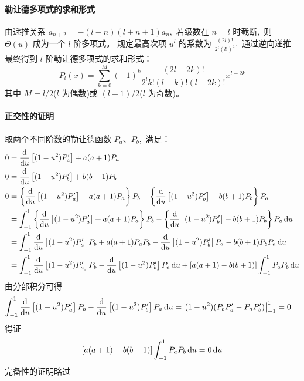 \paragraph{勒让德多项式的求和形式}
由递推关系 $a_{n+2} = -(l-n)(l+n+1)a_n$, \,若级数在 $n=l$ 时截断, \,则 $\Theta(u)$ 成为一个 $l$ 阶多项式。
规定最高次项 $u^l$ 的系数为 $\frac{(2l)!}{2^l(l!)^2}$, \,通过逆向递推
最终得到 $l$ 阶勒让德多项式的求和形式：
\begin{equation}
    P_l(x) = \sum_{k=0}^{M} (-1)^k \frac{(2l-2k)!}{2^l k! (l-k)! (l-2k)!} x^{l-2k}
\end{equation}
其中 $M = l/2$($l$ 为偶数)或 $(l-1)/2$($l$ 为奇数)。

\paragraph{正交性的证明}
取两个不同阶数的勒让德函数 $P_a$、$P_b$, \,满足：
\begin{align*}
    0&=
\frac{\dif}{\dif u}\left[(1-u^2)P_a'\right]
+a(a+1)P_a\\
    0&=
\frac{\dif}{\dif u}\left[(1-u^2)P_b'\right]
+b(b+1)P_b\\
    0&=
\left\{\frac{\dif}{\dif u}\left[(1-u^2)P_a'\right]
+a(a+1)P_a\right\}P_b
-\left\{\frac{\dif}{\dif u}\left[(1-u^2)P_b'\right]
+b(b+1)P_b\right\}P_a
\\
&=\int_{-1}^{1}
\left\{\frac{\dif}{\dif u}\left[(1-u^2)P_a'\right]
+a(a+1)P_a\right\}P_b
-\left\{\frac{\dif}{\dif u}\left[(1-u^2)P_b'\right]
+b(b+1)P_b\right\}P_a\dif u
\\
&=\int_{-1}^{1}
\frac{\dif}{\dif u}\left[(1-u^2)P_a'\right]P_b
+a(a+1)P_aP_b
-\frac{\dif}{\dif u}\left[(1-u^2)P_b'\right]P_a
-b(b+1)P_bP_a\dif u
\\
&=\int_{-1}^{1}
\frac{\dif}{\dif u}\left[(1-u^2)P_a'\right]P_b
-\frac{\dif}{\dif u}\left[(1-u^2)P_b'\right]P_a\dif u
+\left[a(a+1)-b(b+1)\right]\int_{-1}^{1}P_aP_b
\dif u
\end{align*}
由分部积分可得
\begin{align*}
    \int_{-1}^{1}
\frac{\dif}{\dif u}\left[(1-u^2)P_a'\right]P_b
-\frac{\dif}{\dif u}\left[(1-u^2)P_b'\right]P_a\dif u
&=\left.(1-u^2)(P_bP_a'-P_aP_b')\right|_{-1}^{1}=0
\end{align*}
得证
\begin{align*}
    \left[a(a+1)-b(b+1)\right]\int_{-1}^{1}P_aP_b
\dif u=0
\dif u
\end{align*}
完备性的证明略过
